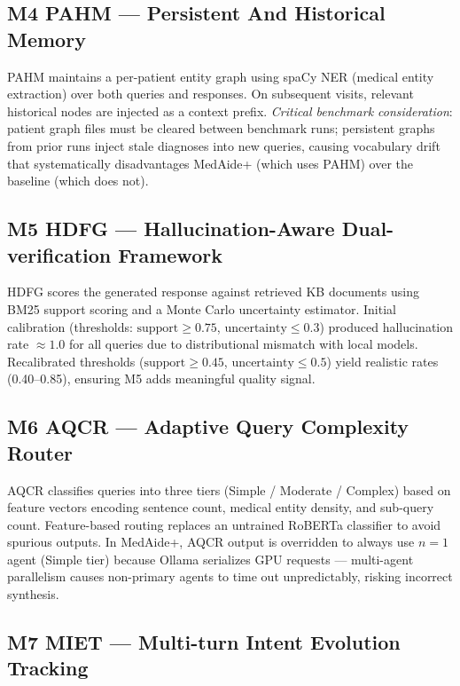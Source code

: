 \documentclass[conference]{IEEEtran}
\begin{document}
\subsection{M4 PAHM — Persistent And Historical Memory}

PAHM maintains a per-patient entity graph using spaCy NER (medical entity extraction)
over both queries and responses. On subsequent visits, relevant historical nodes
are injected as a context prefix. \emph{Critical benchmark consideration}: patient graph
files must be cleared between benchmark runs; persistent graphs from prior runs inject
stale diagnoses into new queries, causing vocabulary drift that systematically
disadvantages MedAide+ (which uses PAHM) over the baseline (which does not).

\subsection{M5 HDFG — Hallucination-Aware Dual-verification Framework}

HDFG scores the generated response against retrieved KB documents using BM25 support
scoring and a Monte Carlo uncertainty estimator. Initial calibration (thresholds:
$\text{support}\geq 0.75$, $\text{uncertainty}\leq 0.3$) produced hallucination rate
$\approx 1.0$ for all queries due to distributional mismatch with local models.
Recalibrated thresholds ($\text{support}\geq 0.45$, $\text{uncertainty}\leq 0.5$)
yield realistic rates (0.40–0.85), ensuring M5 adds meaningful quality signal.

\subsection{M6 AQCR — Adaptive Query Complexity Router}

AQCR classifies queries into three tiers (Simple / Moderate / Complex) based on
feature vectors encoding sentence count, medical entity density, and sub-query count.
Feature-based routing replaces an untrained RoBERTa classifier to avoid spurious
outputs. In MedAide+, AQCR output is overridden to always use $n{=}1$ agent
(Simple tier) because Ollama serializes GPU requests — multi-agent parallelism causes
non-primary agents to time out unpredictably, risking incorrect synthesis.

\subsection{M7 MIET — Multi-turn Intent Evolution Tracking}
\end{document}
